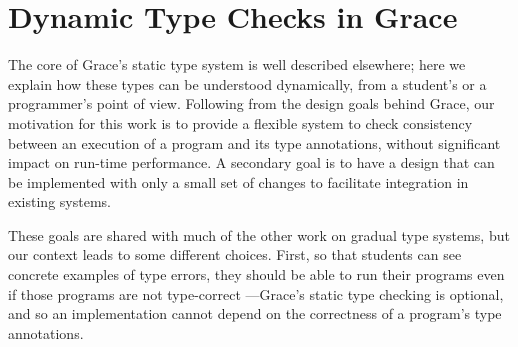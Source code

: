 
\section{Dynamic Type Checks in Grace}
\label{sec:method}




%
%
The core of Grace's static type system is well described elsewhere\citep{JonesECOOP2016}; here we explain how these types can be understood
dynamically, from a student's or a programmer's point of view.
Following from the design goals behind Grace,
our motivation for this work
is to provide a flexible system 
to check consistency between an execution of a program
and its type annotations,
without significant impact on run-time performance.
A secondary goal is to have a design that can be implemented with
only a small set of changes to facilitate integration in existing systems.
%
%


These goals are shared with much of the other work on gradual type
systems, but our context leads to some different choices. First, so
that students can see concrete examples of type errors, they should be
able to run their programs even if those programs are not type-correct%
---\ie Grace's static type checking is optional, and so an
implementation cannot depend on the correctness of a program's type
annotations.


